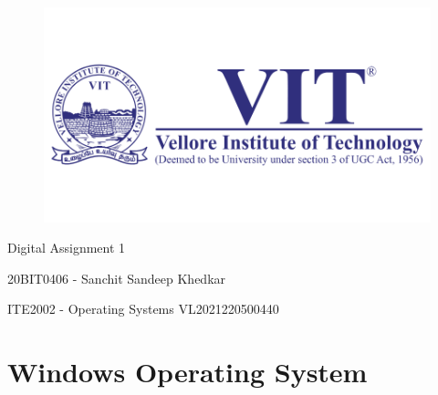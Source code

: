 \documentclass[12pt]{article}
\begin{document}
\begin{titlepage}
\NoBgThispage
   \begin{center}
        \begin{figure}[h] %
        \centering
        \includegraphics[width=15cm]{1583124354phpJTtnK5.png}
        \end{figure}

        \Huge{Digital Assignment 1}

        \vspace{0.5cm}
        \LARGE{20BIT0406 - Sanchit Sandeep Khedkar}
       
        \vspace{2.5 cm}

        \vspace{0.25 cm}
        \Large{ITE2002 - Operating Systems}
        \large{VL2021220500440}
       

       \vfill
    \end{center}
\end{titlepage}
\newpage
\section*{Windows Operating System}
\end{document}
